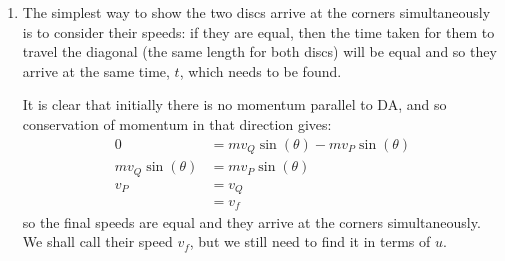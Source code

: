 \begin{hint}
{\begin{enumerate}
To transform into the ZMF we need to find the speed of the ZMF, $v_{\textrm{ZMF}} = \frac{m_{1}v_{1} + m_{2}v_{2}}{m_{1} + m_{2}}$ for two discs moving along a line. Here we find $v_{\textrm{ZMF}} = \frac{u}{2}$ and so we subtract this from the velocity of everything. The table is then also moving backwards at $\frac{u}{2}$, as indicated at the bottom of both cells in Figure \ref{fig:Dynamics_ZMF_table_collision}, but this does not affect the system. Once $v_{\textrm{ZMF}}$ has been subtracted, we get the situation in Figure \ref{fig:Dynamics_ZMF_table_collision} cell $(2)$.
After the collision in the ZMF both discs must have the same speed, $v$, in opposite directions and at some angle $\phi$ with with direction DA, in order that momentum be zero and energy be conserved. Since the masses are equal, moving in opposite directions at the same speed will sum to zero momentum and the kinetic energy loss is (probably) not total so they must have a non-zero speed. It will become clear later that $\phi$ is in fact $0$, but for now an arbitrary angle will suffice; since any direction will give a total momentum of zero.

	\item The simplest way to show the two discs arrive at the corners simultaneously is to consider their speeds: if they are equal, then the time taken for them to travel the diagonal (the same length for both discs) will be equal and so they arrive at the same time, $t$, which needs to be found.

It is clear that initially there is no momentum parallel to DA, and so conservation of momentum in that direction gives:
\begin{align*} 0 &= mv_{Q} \sin(\theta) - mv_{P}\sin(\theta) \\ mv_{Q}\sin(\theta) &= mv_{P}\sin(\theta) \\ v_{P} &= v_{Q} \\ &= v_{f}\end{align*}
so the final speeds are equal and they arrive at the corners simultaneously. We shall call their speed $v_{f}$, but we still need to find it in terms of $u$.


\end{enumerate}}
\end{hint}
